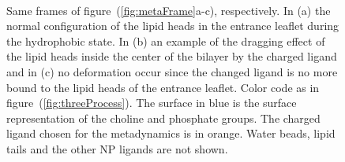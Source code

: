 \begin{figure}[!ht]
	\center
	\ %
	\\\medskip%
	\caption{Same frames of figure~(\ref{fig:metaFrame}a-c), respectively. In (a) the normal configuration of the lipid heads in the entrance leaflet during the hydrophobic state. In (b) an example of the dragging effect of the lipid heads inside the center of the bilayer by the charged ligand and in (c) no deformation occur since the changed ligand is no more bound to the lipid heads of the entrance leaflet. Color code as in figure~(\ref{fig:threeProcess}). The surface in blue is the surface representation of the choline and phosphate groups. The charged ligand chosen for the metadynamics is in orange. Water beads, lipid tails and the other \acs{NP} ligands are not shown.}%
	\label{fig:NC3Dragging}
\end{figure}
